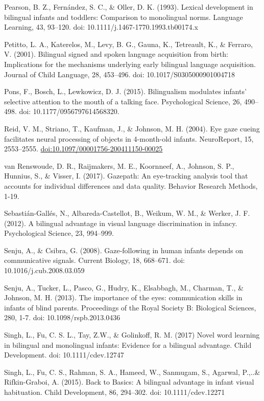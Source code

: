 \documentclass[,man,floatsintext]{apa6}
\begin{document}
Pearson, B. Z., Fernández, S. C., \& Oller, D. K. (1993). Lexical development in bilingual infants and toddlers: Comparison to monolingual norms. Language Learning, 43, 93--120. doi: 10.1111/j.1467-1770.1993.tb00174.x

Petitto, L. A., Katerelos, M., Levy, B. G., Gauna, K., Tetreault, K., \& Ferraro, V. (2001). Bilingual signed and spoken language acquisition from birth: Implications for the mechanisms underlying early bilingual language acquisition. Journal of Child Language, 28, 453--496. doi: 10.1017/S0305000901004718

Pons, F., Bosch, L., Lewkowicz, D. J. (2015). Bilingualism modulates infants' selective attention to the mouth of a talking face. Psychological Science, 26, 490--498. doi: 10.1177/0956797614568320.

Reid, V. M., Striano, T., Kaufman, J., \& Johnson, M. H. (2004). Eye gaze cueing facilitates neural processing of objects in 4-month-old infants. NeuroReport, 15, 2553--2555. \url{doi:10.1097/00001756-200411150-00025}

van Renswoude, D. R., Raijmakers, M. E., Koornneef, A., Johnson, S. P., Hunnius, S., \& Visser, I. (2017). Gazepath: An eye-tracking analysis tool that accounts for individual differences and data quality. Behavior Research Methods, 1-19.

Sebastián-Gallés, N., Albareda-Castellot, B., Weikum, W. M., \& Werker, J. F. (2012). A bilingual advantage in visual language discrimination in infancy. Psychological Science, 23, 994--999.

Senju, A., \& Csibra, G. (2008). Gaze-following in human infants depends on communicative signals. Current Biology, 18, 668--671. doi: 10.1016/j.cub.2008.03.059

Senju, A., Tucker, L., Pasco, G., Hudry, K., Elsabbagh, M., Charman, T., \& Johnson, M. H. (2013). The importance of the eyes: communication skills in infants of blind parents. Proceedings of the Royal Society B: Biological Sciences, 280, 1-7. doi: 10.1098/rspb.2013.0436

Singh, L., Fu, C. S. L., Tay, Z.W., \& Golinkoff, R. M. (2017) Novel word learning in bilingual and monolingual infants: Evidence for a bilingual advantage. Child Development. doi: 10.1111/cdev.12747

Singh, L., Fu, C. S., Rahman, S. A., Hameed, W., Sanmugam, S., Agarwal, P.,..\& Rifkin-Graboi, A. (2015). Back to Basics: A bilingual advantage in infant visual habituation. Child Development, 86, 294--302. doi: 10.1111/cdev.12271
\end{document}

